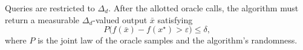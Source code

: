 \documentclass[10pt]{article}
\theoremstyle{definition}
\begin{document}
Queries are restricted to $\Delta_d$. After the allotted oracle calls, the algorithm must return a measurable $\Delta_d$-valued output $\bar{x}$ satisfying
\[
P\bigl(f(\bar{x})-f(x^\star)>\varepsilon\bigr)\leq\delta,
\]
where $P$ is the joint law of the oracle samples and the algorithm's randomness.
\end{document}
